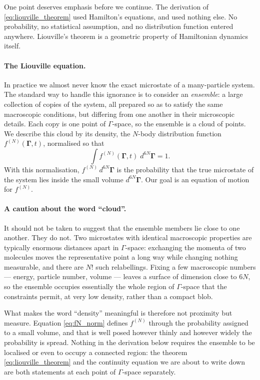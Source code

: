 \documentclass[12pt]{article}
\renewcommand{\vec}[1]{\bm{#1}}
\begin{document}
One point deserves emphasis before we continue.  The derivation of
\eqref{eq:liouville_theorem} used Hamilton's equations, and used
nothing else.  No probability, no statistical assumption, and no
distribution function entered anywhere.  Liouville's theorem is a
geometric property of Hamiltonian dynamics itself.

\paragraph{The Liouville equation.}  In practice we almost never know
the exact microstate of a many-particle system.  The standard way to
handle this ignorance is to consider an \emph{ensemble}: a large
collection of copies of the system, all prepared so as to satisfy the
same macroscopic conditions, but differing from one another in their
microscopic details.  Each copy is one point of $\Gamma$-space, so the
ensemble is a cloud of points.  We describe this cloud by its density,
the $N$-body distribution function $f^{(N)}(\vec\Gamma,t)$, normalised
so that
%
\begin{equation}
  \int f^{(N)}(\vec\Gamma,t)\;d^{6N}\vec\Gamma = 1 .
  \label{eq:fN_norm}
\end{equation}
%
With this normalisation, $f^{(N)}\,d^{6N}\vec\Gamma$ is the probability
that the true microstate of the system lies inside the small volume
$d^{6N}\vec\Gamma$.  Our goal is an equation of motion for $f^{(N)}$.

\paragraph{A caution about the word ``cloud''.}  It should not be taken
to suggest that the ensemble members lie close to one another.  They do
not.  Two microstates with identical macroscopic properties are
typically enormous distances apart in $\Gamma$-space: exchanging the
momenta of two molecules moves the representative point a long way
while changing nothing measurable, and there are $N!$ such
relabellings.  Fixing a few macroscopic numbers --- energy, particle
number, volume --- leaves a surface of dimension close to $6N$, so the
ensemble occupies essentially the whole region of $\Gamma$-space that
the constraints permit, at very low density, rather than a compact
blob.

What makes the word ``density'' meaningful is therefore not proximity
but measure.  Equation \eqref{eq:fN_norm} defines $f^{(N)}$ through the
probability assigned to a small volume, and that is well posed however
thinly and however widely the probability is spread.  Nothing in the
derivation below requires the ensemble to be localised or even to
occupy a connected region: the theorem
\eqref{eq:liouville_theorem} and the continuity equation we are about
to write down are both statements at each point of $\Gamma$-space
separately.
\end{document}

